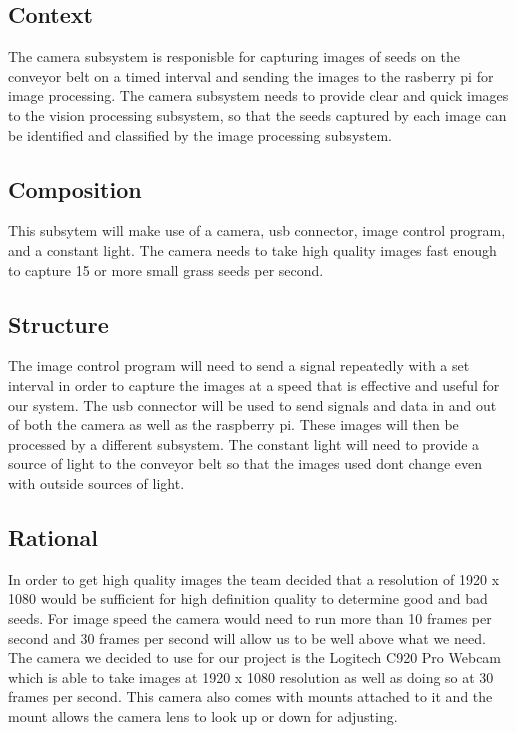 \subsection{Context}

The camera subsystem is responisble for capturing images of seeds on the conveyor belt on a timed interval and sending the images to the rasberry pi for image processing. The camera subsystem needs to provide clear and quick images to the vision processing subsystem, so that the seeds captured by each image can be identified and classified by the image processing subsystem. 

\subsection{Composition}
This subsytem will make use of a camera, usb connector, image control program, and a constant light. The camera needs to take high quality images fast enough to capture 15 or more small grass seeds per second. 

\subsection{Structure}
The image control program will need to send a signal repeatedly with a set interval in order to capture the images at a speed that is effective and useful for our system. The usb connector will be used to send signals and data in and out of both the camera as well as the raspberry pi. These images will then be processed by a different subsystem. The constant light will need to provide a source of light to the conveyor belt so that the images used dont change even with outside sources of light.

\subsection{Rational}
In order to get high quality images the team decided that a resolution of 1920 x 1080 would be sufficient for high definition quality to determine good and bad seeds. For image speed the camera would need to run more than 10 frames per second and 30 frames per second will allow us to be well above what we need. The camera we decided to use for our project is the Logitech C920 Pro Webcam which is able to take images at 1920 x 1080 resolution as well as doing so at 30 frames per second. This camera also comes with mounts attached to it and the mount allows the camera lens to look up or down for adjusting. 

